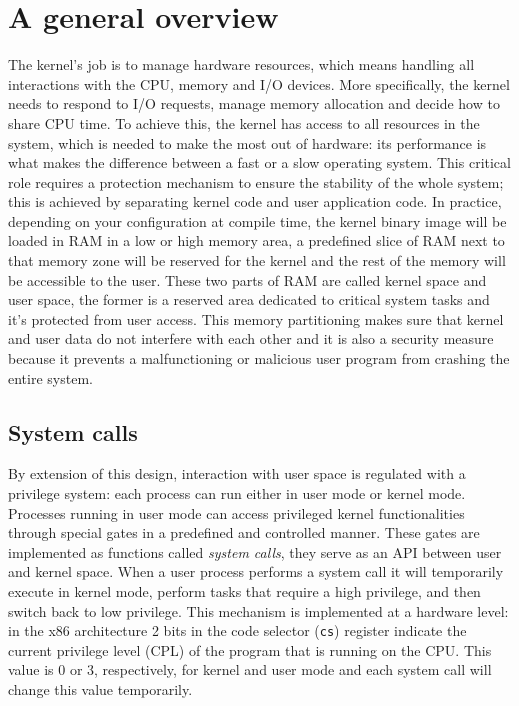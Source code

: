 \documentclass[10pt]{book}
\begin{document}
\section{A general overview} 
\label{sec:general}
The kernel's job is to manage hardware resources, which means handling all interactions with the CPU, memory and I/O devices. More specifically, the kernel needs to respond to I/O requests, manage memory allocation and decide how to share CPU time. To achieve this, the kernel has access to all resources in the system, which is needed to make the most out of hardware: its performance is what makes the difference between a fast or a slow operating system. This critical role requires a protection mechanism to ensure the stability of the whole system; this is achieved by separating kernel code and user application code. %
In practice, depending on your configuration at compile time, the kernel binary image will be loaded in RAM in a low or high memory area, a predefined slice of RAM next to that memory zone will be reserved for the kernel and the rest of the memory will be accessible to the user. These two parts of RAM are called kernel space and user space, the former is a reserved area dedicated to critical system tasks and it's protected from user access. This memory partitioning makes sure that kernel and user data do not interfere with each other and it is also a security measure because it prevents a malfunctioning or malicious user program from crashing the entire system.

\subsection{System calls} By extension of this design, interaction with user space is regulated with a privilege system: each process can run either in user mode or kernel mode. Processes running in user mode can access privileged kernel functionalities through special gates in a predefined and controlled manner. These gates are implemented as functions called \textit{system calls}, they serve as an API between user and kernel space. When a user process performs a system call it will temporarily execute in kernel mode, perform tasks that require a high privilege, and then switch back to low privilege. This mechanism is implemented at a hardware level: in the x86 architecture 2 bits in the code selector (\verb|cs|) register indicate the current privilege level (CPL) of the program that is running on the CPU. This value is 0 or 3, respectively, for kernel and user mode and each system call will change this value temporarily. 
\end{document}
